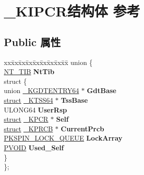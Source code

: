 \hypertarget{struct___k_i_p_c_r}{}\section{\+\_\+\+K\+I\+P\+C\+R结构体 参考}
\label{struct___k_i_p_c_r}
\subsection*{Public 属性}
\begin{DoxyCompactItemize}
\item 
\mbox{\label{struct___k_i_p_c_r_a9ea0451ee960f3aca05b39ba92410076}} 
\begin{tabbing}
xx\=xx\=xx\=xx\=xx\=xx\=xx\=xx\=xx\=\kill
union \{\\
\>\hyperlink{struct___n_t___t_i_b}{NT\_TIB} {\bfseries NtTib}\\
\mbox{\label{union___k_i_p_c_r_1_1_0D1927_a50ad4c30d809f295d13253ff5414d114}} 
\>struct \{\\
\>\>union \hyperlink{union___k_g_d_t_e_n_t_r_y64}{\_KGDTENTRY64} $\ast$ {\bfseries GdtBase}\\
\>\>\hyperlink{interfacestruct}{struct} \hyperlink{struct___k_t_s_s64}{\_KTSS64} $\ast$ {\bfseries TssBase}\\
\>\>ULONG64 {\bfseries UserRsp}\\
\>\>\hyperlink{interfacestruct}{struct} \hyperlink{struct___k_p_c_r}{\_KPCR} $\ast$ {\bfseries Self}\\
\>\>\hyperlink{interfacestruct}{struct} \hyperlink{struct___k_p_r_c_b}{\_KPRCB} $\ast$ {\bfseries CurrentPrcb}\\
\>\>\hyperlink{struct___k_s_p_i_n___l_o_c_k___q_u_e_u_e}{PKSPIN\_LOCK\_QUEUE} {\bfseries LockArray}\\
\>\>\hyperlink{interfacevoid}{PVOID} {\bfseries Used\_Self}\\
\>\} \\
\}; \\


\end{tabbing}
\end{DoxyCompactItemize}
